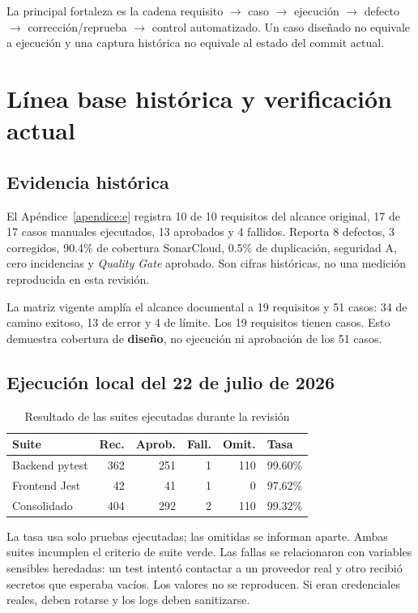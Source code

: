 La principal fortaleza es la cadena requisito $\rightarrow$ caso $\rightarrow$
ejecución $\rightarrow$ defecto $\rightarrow$ corrección/reprueba $\rightarrow$
control automatizado. Un caso diseñado no equivale a ejecución y una captura
histórica no equivale al estado del commit actual.

\section{Línea base histórica y verificación actual}

\subsection{Evidencia histórica}

El Apéndice~\ref{apendice:e} registra 10 de 10 requisitos del alcance original,
17 de 17 casos manuales ejecutados, 13 aprobados y 4 fallidos. Reporta 8 defectos,
3 corregidos, 90.4\% de cobertura SonarCloud, 0.5\% de duplicación, seguridad A,
cero incidencias y \textit{Quality Gate} aprobado. Son cifras históricas, no una
medición reproducida en esta revisión.

La matriz vigente amplía el alcance documental a 19 requisitos y 51 casos: 34 de
camino exitoso, 13 de error y 4 de límite. Los 19 requisitos tienen casos. Esto
demuestra cobertura de \textbf{diseño}, no ejecución ni aprobación de los 51 casos.

\subsection{Ejecución local del 22 de julio de 2026}

\begin{table}[H]
\centering
\caption{Resultado de las suites ejecutadas durante la revisión}
\label{tab:ejecucion-actual-iso}
\begin{tabular}{lrrrrl}
\toprule
\textbf{Suite} & \textbf{Rec.} & \textbf{Aprob.} & \textbf{Fall.} & \textbf{Omit.} & \textbf{Tasa}\\
\midrule
Backend pytest & 362 & 251 & 1 & 110 & 99.60\%\\
Frontend Jest & 42 & 41 & 1 & 0 & 97.62\%\\
Consolidado & 404 & 292 & 2 & 110 & 99.32\%\\
\bottomrule
\end{tabular}
\end{table}

La tasa usa solo pruebas ejecutadas; las omitidas se informan aparte. Ambas suites
incumplen el criterio de suite verde. Las fallas se relacionaron con variables
sensibles heredadas: un test intentó contactar a un proveedor real y otro recibió
secretos que esperaba vacíos. Los valores no se reproducen. Si eran credenciales
reales, deben rotarse y los logs deben sanitizarse.

